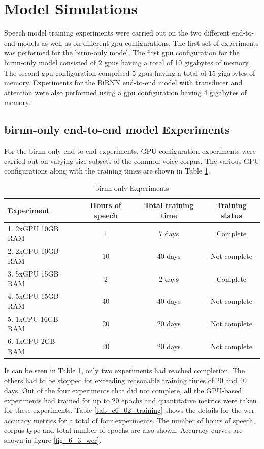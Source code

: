 \section{Model Simulations}

Speech model training experiments were carried out on the two different end-to-end models as well as on different \acrshort{gpu} configurations. The first set of experiments was performed for the \acrshort{birnn}-only model.  The first \acrshort{gpu} configuration for the \acrshort{birnn}-only model consisted of 2 \acrshort{gpu}s having a total of 10 gigabytes of memory. The second \acrshort{gpu} configuration comprised 5 \acrshort{gpu}s having a total of 15 gigabytes of memory. Experiments for the BiRNN end-to-end model with transducer and attention were also performed using a \acrshort{gpu} configuration having 4 gigabytes of memory. 

\subsection{\acrshort{birnn}-only end-to-end model Experiments}
For the \acrshort{birnn}-only end-to-end experiments, GPU configuration experiments were carried out on varying-size subsets of the common voice corpus.   The various GPU configurations along with the training times are shown in Table \ref{tab_c6_01_training}.

\begin{table}
  \caption{\acrshort{birnn}-only Experiments}
  \label{tab_c6_01_training}
\begin{tabular}{lccc}
\toprule
Experiment & Hours of speech & Total training time & Training status\\
\midrule
1. 2xGPU 10GB RAM & 1 & 7 days & Complete\\
2. 2xGPU 10GB RAM & 10 & 40 days & Not complete\\
3. 5xGPU 15GB RAM & 2 & 2 days & Complete\\
4. 5xGPU 15GB RAM & 40 & 40 days & Not complete\\
5. 1xCPU 16GB RAM & 20 & 20 days & Not complete\\
6. 1xGPU 2GB RAM & 20 & 20 days & Not complete\\
\bottomrule
\end{tabular}
\end{table}

It can be seen in Table \ref{tab_c6_01_training}, only two experiments had reached completion.    The others had to be stopped for exceeding reasonable training times of 20 and 40 days. Out of the four experiments that did not complete, all the GPU-based experiments had trained for up to 20 epochs and quantitative metrics were taken for these experiments.  Table \ref{tab_c6_02_training} shows the details for the \acrfull{wer} accuracy metrics for a total of four experiments. The number of hours of speech, corpus type and total number of epochs are also shown. Accuracy curves are shown in figure \ref{fig_6_3_wer}.

